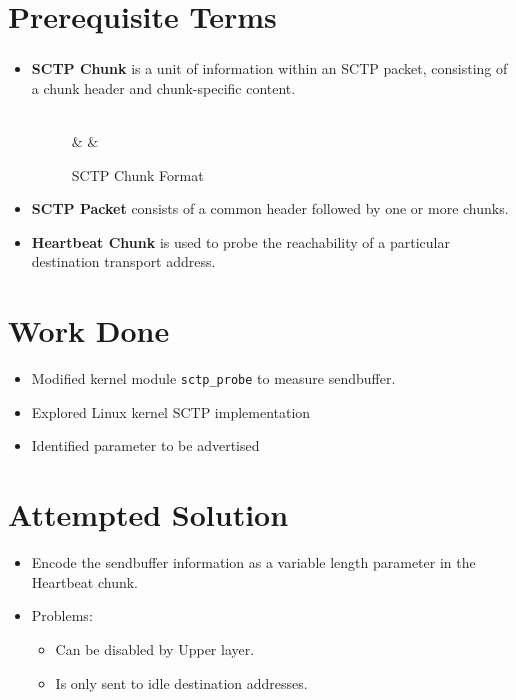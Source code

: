 \documentclass{beamer}
\begin{document}
\section{Prerequisite Terms}
\begin{frame}[fragile]
\frametitle{\insertsection}
\begin{itemize}
\item \textbf{SCTP Chunk} is a unit of information within an SCTP packet,
consisting of a chunk header and chunk-specific content.

\begin{figure}[h]
	\centering
	\begin{bytefield}{32}
	\\
	 &  & \\
	\end{bytefield}
	\caption{SCTP Chunk Format \cite{rfc4960}}
\end{figure}

\item \textbf{SCTP Packet} consists of a common header followed by one or
	more chunks.

\item \textbf{Heartbeat Chunk} is used to probe the
reachability of a particular destination transport address.
\end{itemize}
\end{frame}

\section{Work Done}
\begin{frame}{\insertsection}
\begin{itemize}
\item Modified kernel module \texttt{sctp\_probe} to measure sendbuffer.
\item Explored Linux kernel SCTP implementation
\item Identified parameter to be advertised
\end{itemize}
\end{frame}

\section{Attempted Solution}
\begin{frame}{\insertsection}
\begin{itemize}
\item Encode the sendbuffer information as a variable length
	parameter in the Heartbeat chunk.
\item Problems:
	\begin{itemize}
		\item Can be disabled by Upper layer.
		\item Is only sent to idle destination addresses.
	\end{itemize}
\end{itemize}
\end{frame}
\end{document}
